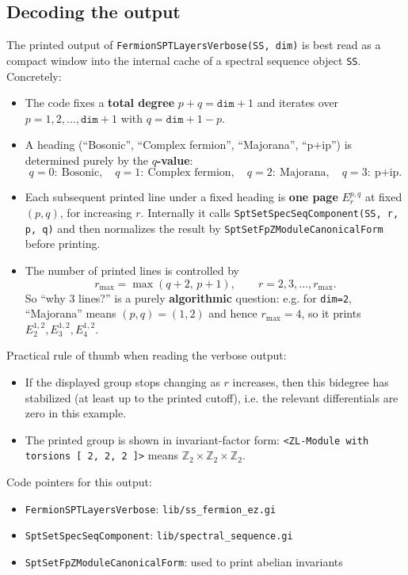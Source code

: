 \documentclass{SciPost}
\begin{document}
\subsection{Decoding the output}

The printed output of \texttt{FermionSPTLayersVerbose(SS, dim)} is best read as a compact window into the internal cache of a spectral sequence object \texttt{SS}.
Concretely:
\begin{itemize}
    \item The code fixes a \textbf{total degree} $p+q=\texttt{dim}+1$ and iterates over $p=1,2,\dots,\texttt{dim}+1$ with $q=\texttt{dim}+1-p$.
    \item A heading (``Bosonic'', ``Complex fermion'', ``Majorana'', ``p+ip'') is determined purely by the \textbf{$q$-value}:
    \begin{equation}
    q=0:\ \text{Bosonic},\quad q=1:\ \text{Complex fermion},\quad q=2:\ \text{Majorana},\quad q=3:\ \text{p+ip}.
    \end{equation}
    \item Each subsequent printed line under a fixed heading is \textbf{one page} $E_r^{p,q}$ at fixed $(p,q)$, for increasing $r$.
    Internally it calls \texttt{SptSetSpecSeqComponent(SS, r, p, q)} and then normalizes the result by \texttt{SptSetFpZModuleCanonicalForm} before printing.
    \item The number of printed lines is controlled by
    \begin{equation}
    r_{\max}=\max(q+2,\,p+1),\qquad r=2,3,\dots,r_{\max}.
    \end{equation}
    So ``why 3 lines?'' is a purely \textbf{algorithmic} question: e.g. for \texttt{dim=2}, ``Majorana'' means $(p,q)=(1,2)$ and hence $r_{\max}=4$, so it prints $E_2^{1,2},E_3^{1,2},E_4^{1,2}$.
\end{itemize}

Practical rule of thumb when reading the verbose output:
\begin{itemize}
    \item If the displayed group stops changing as $r$ increases, then this bidegree has stabilized (at least up to the printed cutoff), i.e. the relevant differentials are zero in this example.
    \item The printed group is shown in invariant-factor form: \texttt{<ZL-Module with torsions [ 2, 2, 2 ]>} means $\mathbb{Z}_2\times\mathbb{Z}_2\times\mathbb{Z}_2$.
\end{itemize}

Code pointers for this output:
\begin{itemize}
    \item \texttt{FermionSPTLayersVerbose}: \texttt{lib/ss\_fermion\_ez.gi}
    \item \texttt{SptSetSpecSeqComponent}: \texttt{lib/spectral\_sequence.gi}
    \item \texttt{SptSetFpZModuleCanonicalForm}: used to print abelian invariants
\end{itemize}
\end{document}
